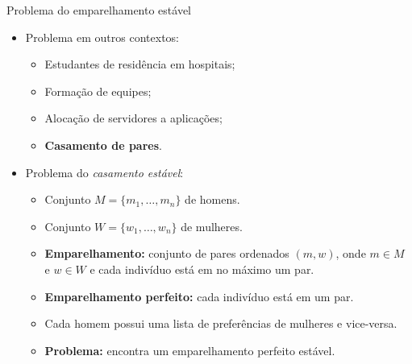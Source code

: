 \begin{frame}{Problema do emparelhamento estável}
	\begin{itemize}
		\item Problema em outros contextos:
		\begin{itemize}
			\item Estudantes de residência em hospitais;
			\item Formação de equipes;
			\item Alocação de servidores a aplicações;
			\item \textbf{\color{magenta}Casamento de pares}.
		\end{itemize}
	
		\medskip
		\item Problema do \textit{casamento estável}:
		\begin{itemize}
			\item Conjunto $M = \{m_1, \dots, m_n\}$ de homens.
			\item Conjunto $W = \{w_1, \dots, w_n\}$ de mulheres.
			\item \textbf{Emparelhamento:} conjunto de pares ordenados $(m, w)$, onde $m \in M$ e $w \in W$ e cada indivíduo está em no máximo um par.
			\item \textbf{Emparelhamento perfeito:} cada indivíduo está em um par.
			\item Cada homem possui uma lista de preferências de mulheres e vice-versa.
			\item \textbf{Problema:} encontra um emparelhamento perfeito estável.
		\end{itemize}
	\end{itemize}
\end{frame}



